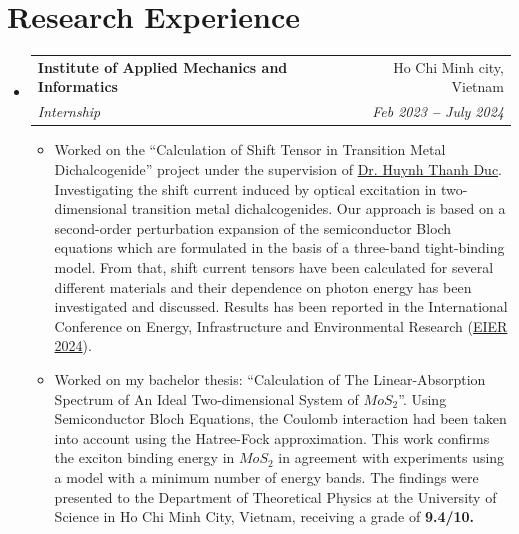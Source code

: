 \documentclass[letterpaper,11pt]{article}
\makeatletter
\newcommand{\resumeItem}[1]{
	\item\small{
		{#1 \vspace{-2pt}}
	}
}
\newcommand{\resumeSubheading}[4]{
	\vspace{-2pt}\item
	\begin{tabular*}{0.97\textwidth}[t]{l@{\extracolsep{\fill}}r}
		\textbf{#1} & #2 \\
		\textit{\small#3} & \textit{\small #4} \\
	\end{tabular*}\vspace{-7pt}
}
\newcommand{\resumeSubHeadingListStart}{\begin{itemize}[leftmargin=0.15in, label={}]}
\newcommand{\resumeSubHeadingListEnd}{\end{itemize}}
\newcommand{\resumeItemListStart}{\begin{itemize}}
\newcommand{\resumeItemListEnd}{\end{itemize}\vspace{-5pt}}
\makeatother
\begin{document}
	
	
	
	\section{Research Experience}
	\vspace{3pt}
	\resumeSubHeadingListStart
	
	
	\resumeSubheading
	{Institute of Applied Mechanics and Informatics}{Ho Chi Minh city, Vietnam}
	{Internship}{Feb 2023 \textbf{--} July 2024}
	\resumeItemListStart
	\resumeItem{Worked on the “Calculation of Shift Tensor in Transition Metal Dichalcogenide” project under the supervision of \href{https://scholar.google.com.vn/citations?user=EecHVyQAAAAJ&hl=en}{\color{blue} Dr. Huynh Thanh Duc}. Investigating the shift current induced by optical excitation in two-dimensional transition metal dichalcogenides. Our approach is based on a second-order perturbation expansion of the semiconductor Bloch equations which are formulated in the basis of a three-band tight-binding model. From that, shift current tensors have been calculated for several different materials and their dependence on photon energy has been investigated and discussed. Results has been reported in the International Conference on Energy, Infrastructure and Environmental Research (\href{	https://doi.org/10.1051/e3sconf/202449602002}{\color{blue}EIER 2024}).}
	\resumeItem{Worked on my bachelor thesis: “Calculation of The Linear-Absorption Spectrum of An Ideal Two-dimensional System of \(MoS_2\)”. Using Semiconductor Bloch Equations, the Coulomb interaction had been taken into account using the Hatree-Fock approximation. This work confirms the exciton binding energy in \(MoS_2\) in agreement with experiments using a model with a minimum number of energy bands. The findings were presented to the Department of Theoretical Physics at the University of Science in Ho Chi Minh City, Vietnam, receiving a grade of \textbf{9.4/10.}}
	\resumeItemListEnd
	\resumeSubHeadingListEnd
\end{document}
